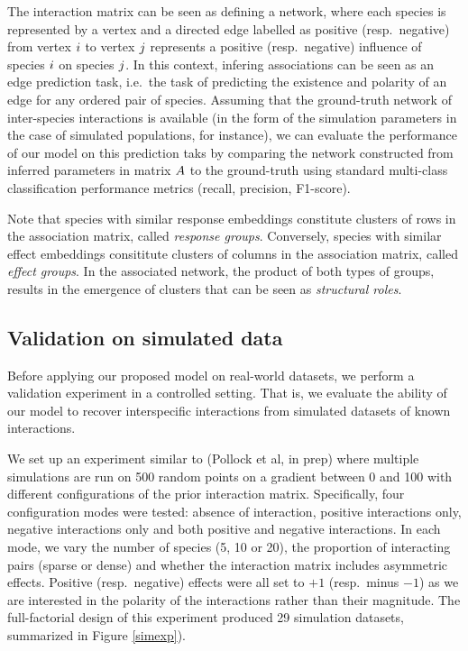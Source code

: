 \documentclass[10pt,a4paper]{article}
\begin{document}
The interaction matrix can be seen as defining a network, where each species is represented by a vertex and a directed edge labelled as positive (resp.\ negative) from vertex $i$ to vertex $j$ represents a positive (resp.\ negative) influence of species $i$ on species $j$.
In this context, infering associations can be seen as an edge prediction task, i.e.\ the task of predicting the existence and polarity of an edge for any ordered pair of species.
Assuming that the ground-truth network of inter-species interactions is available (in the form of the simulation parameters in the case of simulated populations, for instance), we can evaluate the performance of our model on this prediction taks by comparing the network constructed from inferred parameters in matrix $A$ to the ground-truth using standard multi-class classification performance metrics (recall, precision, F1-score).

Note that species with similar response embeddings constitute clusters of rows in the association matrix, called \emph{response groups}. Conversely, species with similar effect embeddings consititute clusters of columns in the association matrix, called \textit{effect groups}.
In the associated network, the product of both types of groups, results in the emergence of clusters that can be seen as \emph{structural roles}. 


\subsection{Validation on simulated data}

Before applying our proposed model on real-world datasets, we perform a validation experiment in a controlled setting. That is, we evaluate the ability of our model to recover interspecific interactions from simulated datasets of known interactions.

We set up an experiment similar to (Pollock et al, in prep) where multiple simulations are run on 500 random points on a gradient between 0 and 100 with different configurations of the prior interaction matrix. Specifically, four configuration modes were tested: absence of interaction, positive interactions only, negative interactions only and both positive and negative interactions. In each mode, we vary the number of species (5, 10 or 20), the proportion of interacting pairs (sparse or dense) and whether the interaction matrix includes asymmetric effects. Positive (resp.\ negative) effects were all set to $+1$ (resp.\ minus $-1$) as we are interested in the polarity of the interactions rather than their magnitude. The full-factorial design of this experiment produced 29 simulation datasets, summarized in Figure \ref{simexp}).
\end{document}
